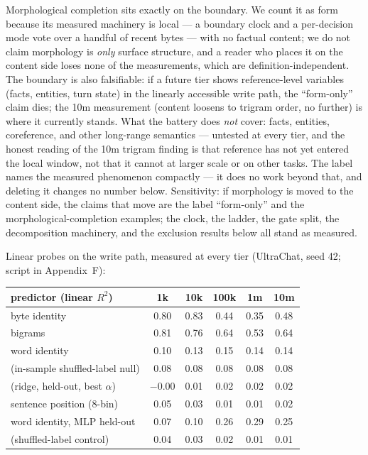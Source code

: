 \documentclass[11pt]{article}
\begin{document}
\noindent{}

\vspace{0.5em}
Morphological completion sits exactly on the boundary. We count
it as form because its measured machinery is local --- a boundary clock
and a per-decision mode vote over a handful of recent bytes --- with no
factual content; we do not claim morphology is \emph{only} surface
structure, and a reader who places it on the content side loses none of
the measurements, which are definition-independent. The boundary is also
falsifiable: if a future tier shows reference-level variables (facts,
entities, turn state) in the linearly accessible write path, the
``form-only'' claim dies; the 10m measurement (content loosens to trigram
order, no further) is where it currently stands. What the battery does
\emph{not} cover: facts, entities, coreference, and other long-range
semantics --- untested at every tier, and the honest reading of the 10m
trigram finding is that reference has not yet entered the local window,
not that it cannot at larger scale or on other tasks. The label names the
measured phenomenon compactly --- it does no work beyond that, and
deleting it changes no number below. Sensitivity: if
morphology is moved to the content side, the claims that move are the
label ``form-only'' and the morphological-completion examples; the clock,
the ladder, the gate split, the decomposition machinery, and the exclusion
results below all stand as measured.

Linear probes on the write path, measured at every tier (UltraChat, seed
42; script in Appendix~F):

\begin{center}
\small
\begin{tabular}{lccccc}
\toprule
predictor (linear $R^2$) & 1k & 10k & 100k & 1m & 10m \\
\midrule
byte identity & 0.80 & 0.83 & 0.44 & 0.35 & 0.48 \\
bigrams & 0.81 & 0.76 & 0.64 & 0.53 & 0.64 \\
word identity & 0.10 & 0.13 & 0.15 & 0.14 & 0.14 \\
\quad (in-sample shuffled-label null) & 0.08 & 0.08 & 0.08 & 0.08 & 0.08 \\
\quad (ridge, held-out, best $\alpha$) & $-0.00$ & 0.01 & 0.02 & 0.02 & 0.02 \\
sentence position (8-bin) & 0.05 & 0.03 & 0.01 & 0.01 & 0.02 \\
word identity, MLP held-out & 0.07 & 0.10 & 0.26 & 0.29 & 0.25 \\
\quad (shuffled-label control) & 0.04 & 0.03 & 0.02 & 0.01 & 0.01 \\
\bottomrule
\end{tabular}
\end{center}
\end{document}
